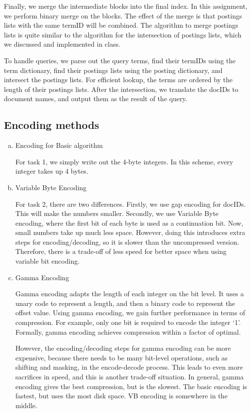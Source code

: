 \documentclass[10pt]{article}
\begin{document}
Finally, we merge the intermediate blocks into the final index. In this assignment, we perform binary merge on the blocks. The effect of the merge is that postings lists with the same termID will be combined. The algorithm to merge postings lists is quite similar to the algorithm for the intersection of postings lists, which we discussed and implemented in class.

To handle queries, we parse out the query terms, find their termIDs using the term dictionary, find their postings lists using the posting dictionary, and intersect the postings lists. For efficient lookup, the terms are ordered by the length of their postings lists. After the intersection, we translate the docIDs to document names, and output them as the result of the query.

\subsection{Encoding methods}
\begin{enumerate}[(a)]
\item Encoding for Basic algorithm

For task 1, we simply write out the 4-byte integers. In this scheme, every integer takes up 4 bytes.
\item Variable Byte Encoding

For task 2, there are two differences. Firstly, we use gap encoding for docIDs. This will make the numbers smaller. Secondly, we use Variable Byte encoding, where the first bit of each byte is used as a continuation bit. Now, small numbers take up much less space. However, doing this introduces extra steps for encoding/decoding, so it is slower than the uncompressed version. Therefore, there is a trade-off of less speed for better space when using variable bit encoding.
\item Gamma Encoding

Gamma encoding adapts the length of each integer on the bit level. It uses a unary code to represent a length, and then a binary code to represent the offset value. Using gamma encoding, we gain further performance in terms of compression. For example, only one bit is required to encode the integer `1'. Formally, gamma encoding achieves compression within a factor of optimal.

However, the encoding/decoding steps for gamma encoding can be more expensive, because there needs to be many bit-level operations, such as shifting and masking, in the encode-decode process. This leads to even more sacrifices in speed, and this is another trade-off situation. In general, gamma encoding gives the best compression, but is the slowest. The basic encoding is fastest, but uses the most disk space. VB encoding is somewhere in the middle.
\end{enumerate}
\end{document}
